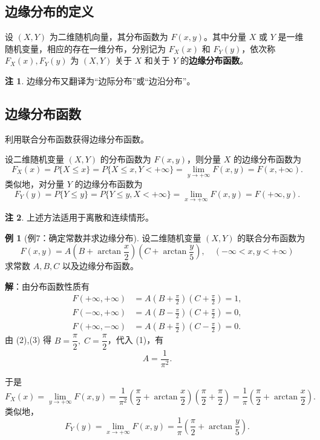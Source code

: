 \documentclass[11pt,a4paper]{report}
\theoremstyle{definition}
\newtheorem{example}{例}[chapter]
\newtheorem{note}{注}[chapter]
\begin{document}
\subsection{边缘分布的定义}

设 $(X,Y)$ 为二维随机向量，其分布函数为 $F(x,y)$。其中分量 $X$ 或 $Y$ 是一维随机变量，相应的存在一维分布，分别记为 $F_{X}(x)$ 和 $F_{Y}(y)$，依次称 $F_{X}(x),F_{Y}(y)$ 为 $(X,Y)$ 关于 $X$ 和关于 $Y$ 的\textbf{边缘分布函数}。

\begin{note}
边缘分布又翻译为``边际分布''或``边沿分布''。
\end{note}

\subsection{边缘分布函数}

利用联合分布函数获得边缘分布函数。

设二维随机变量 $(X,Y)$ 的分布函数为 $F(x,y)$，则分量 $X$ 的边缘分布函数为
\[
F_{X}(x)=P\{X\leq x\}=P\{X\leq x,Y<+\infty\}=\lim_{y\to+\infty}F(x,y)=F(x,+\infty).
\]
类似地，对分量 $Y$ 的边缘分布函数为
\[
F_{Y}(y)=P\{Y\leq y\}=P\{Y\leq y,X<+\infty\}=\lim_{x\to+\infty}F(x,y)=F(+\infty,y).
\]

\begin{note}
上述方法适用于离散和连续情形。
\end{note}

\begin{example}[例7：确定常数并求边缘分布]
设二维随机变量 $(X,Y)$ 的联合分布函数为
\[
F(x,y)=A\left(B+\arctan\frac{x}{2}\right)\left(C+\arctan\frac{y}{5}\right),\quad (-\infty<x,y<+\infty)
\]
求常数 $A,B,C$ 以及边缘分布函数。
\end{example}

\textbf{解}：由分布函数性质有
\begin{align*}
F(+\infty,+\infty)&=A\left(B+\frac{\pi}{2}\right)\left(C+\frac{\pi}{2}\right)=1, \tag{1}\\
F(-\infty,+\infty)&=A\left(B-\frac{\pi}{2}\right)\left(C+\frac{\pi}{2}\right)=0, \tag{2}\\
F(+\infty,-\infty)&=A\left(B+\frac{\pi}{2}\right)\left(C-\frac{\pi}{2}\right)=0. \tag{3}
\end{align*}
由 (2),(3) 得 $B=\dfrac{\pi}{2},\;C=\dfrac{\pi}{2}$，代入 (1)，有
\[
\boxed{A=\frac{1}{\pi^{2}}}.
\]

于是
\[
F_{X}(x)=\lim_{y\to+\infty}F(x,y)=\frac{1}{\pi^{2}}\left(\frac{\pi}{2}+\arctan\frac{x}{2}\right)\left(\frac{\pi}{2}+\frac{\pi}{2}\right)=\frac{1}{\pi}\left(\frac{\pi}{2}+\arctan\frac{x}{2}\right).
\]
类似地，
\[
F_{Y}(y)=\lim_{x\to+\infty}F(x,y)=\frac{1}{\pi}\left(\frac{\pi}{2}+\arctan\frac{y}{5}\right).
\]
\end{document}
